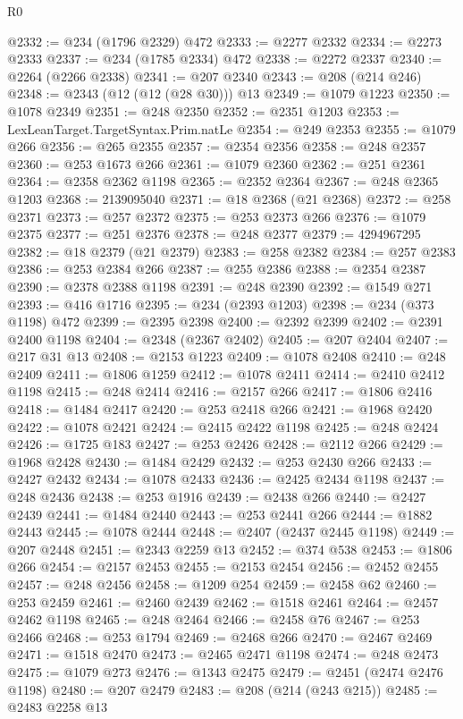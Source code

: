 \begin{lexlean}{R0}
\begin{coremodule}
@2332 := @234 (@1796 @2329) @472
@2333 := @2277 @2332
@2334 := @2273 @2333
@2337 := @234 (@1785 @2334) @472
@2338 := @2272 @2337
@2340 := @2264 (@2266 @2338)
@2341 := @207 @2340
@2343 := @208 (@214 @246)
@2348 := @2343 (@12 (@12 (@28 @30))) @13
@2349 := @1079 @1223
@2350 := @1078 @2349
@2351 := @248 @2350
@2352 := @2351 @1203
@2353 := LexLeanTarget.TargetSyntax.Prim.natLe
@2354 := @249 @2353
@2355 := @1079 @266
@2356 := @265 @2355
@2357 := @2354 @2356
@2358 := @248 @2357
@2360 := @253 @1673 @266
@2361 := @1079 @2360
@2362 := @251 @2361
@2364 := @2358 @2362 @1198
@2365 := @2352 @2364
@2367 := @248 @2365 @1203
@2368 := 2139095040
@2371 := @18 @2368 (@21 @2368)
@2372 := @258 @2371
@2373 := @257 @2372
@2375 := @253 @2373 @266
@2376 := @1079 @2375
@2377 := @251 @2376
@2378 := @248 @2377
@2379 := 4294967295
@2382 := @18 @2379 (@21 @2379)
@2383 := @258 @2382
@2384 := @257 @2383
@2386 := @253 @2384 @266
@2387 := @255 @2386
@2388 := @2354 @2387
@2390 := @2378 @2388 @1198
@2391 := @248 @2390
@2392 := @1549 @271
@2393 := @416 @1716
@2395 := @234 (@2393 @1203)
@2398 := @234 (@373 @1198) @472
@2399 := @2395 @2398
@2400 := @2392 @2399
@2402 := @2391 @2400 @1198
@2404 := @2348 (@2367 @2402)
@2405 := @207 @2404
@2407 := @217 @31 @13
@2408 := @2153 @1223
@2409 := @1078 @2408
@2410 := @248 @2409
@2411 := @1806 @1259
@2412 := @1078 @2411
@2414 := @2410 @2412 @1198
@2415 := @248 @2414
@2416 := @2157 @266
@2417 := @1806 @2416
@2418 := @1484 @2417
@2420 := @253 @2418 @266
@2421 := @1968 @2420
@2422 := @1078 @2421
@2424 := @2415 @2422 @1198
@2425 := @248 @2424
@2426 := @1725 @183
@2427 := @253 @2426
@2428 := @2112 @266
@2429 := @1968 @2428
@2430 := @1484 @2429
@2432 := @253 @2430 @266
@2433 := @2427 @2432
@2434 := @1078 @2433
@2436 := @2425 @2434 @1198
@2437 := @248 @2436
@2438 := @253 @1916
@2439 := @2438 @266
@2440 := @2427 @2439
@2441 := @1484 @2440
@2443 := @253 @2441 @266
@2444 := @1882 @2443
@2445 := @1078 @2444
@2448 := @2407 (@2437 @2445 @1198)
@2449 := @207 @2448
@2451 := @2343 @2259 @13
@2452 := @374 @538
@2453 := @1806 @266
@2454 := @2157 @2453
@2455 := @2153 @2454
@2456 := @2452 @2455
@2457 := @248 @2456
@2458 := @1209 @254
@2459 := @2458 @62
@2460 := @253 @2459
@2461 := @2460 @2439
@2462 := @1518 @2461
@2464 := @2457 @2462 @1198
@2465 := @248 @2464
@2466 := @2458 @76
@2467 := @253 @2466
@2468 := @253 @1794
@2469 := @2468 @266
@2470 := @2467 @2469
@2471 := @1518 @2470
@2473 := @2465 @2471 @1198
@2474 := @248 @2473
@2475 := @1079 @273
@2476 := @1343 @2475
@2479 := @2451 (@2474 @2476 @1198)
@2480 := @207 @2479
@2483 := @208 (@214 (@243 @215))
@2485 := @2483 @2258 @13

\end{coremodule}
\end{lexlean}
